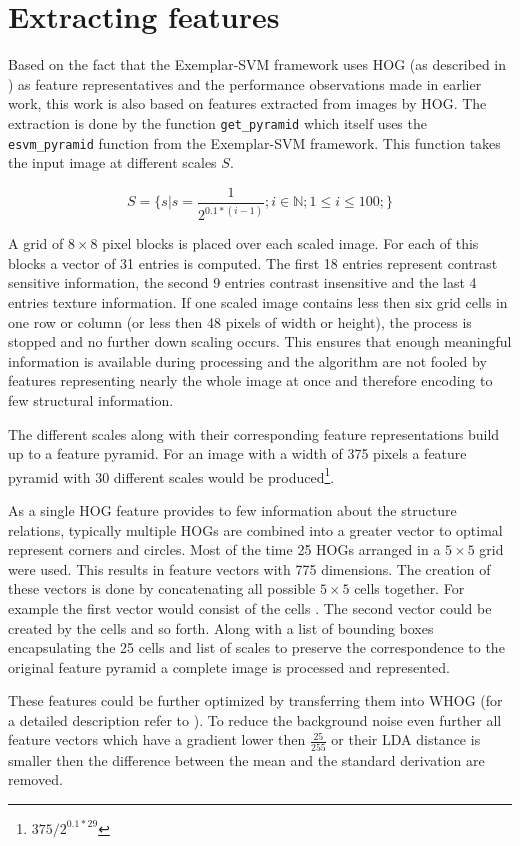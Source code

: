 \section{Extracting features}

Based on the fact that the Exemplar-SVM framework \cite{Malisiewicz2011} uses \ac{HOG} (as described in ) as feature representatives and the performance observations made in earlier work, this work is also based on features extracted from images by \ac{HOG}. The extraction is done by the function \verb|get_pyramid| which itself uses the \verb|esvm_pyramid| function from the Exemplar-SVM framework. This function takes the input image at different scales $S$.

\begin{equation}
S = \{s|s = \frac{1}{2^{0.1 * (i-1)}}; i \in \mathbb{N}; 1 \le i \le 100;\}
\end{equation}

A grid of $8\times8$ pixel blocks is placed over each scaled image. For each of this blocks a vector of 31 entries is computed. The first 18 entries represent contrast sensitive information, the second 9 entries contrast insensitive and the last 4 entries texture information. If one scaled image contains less then six grid cells in one row or column (or less then 48 pixels of width or height), the process is stopped and no further down scaling occurs. This ensures that enough meaningful information is available during processing and the algorithm are not fooled by features representing nearly the whole image at once and therefore encoding to few structural information.
\par
The different scales along with their corresponding feature representations build up to a feature pyramid. For an image with a width of 375 pixels a feature pyramid with 30 different scales would be produced\footnote{$375/2^{0.1 * 29}$}. 

As a single \ac{HOG} feature provides to few information about the structure relations, typically multiple \acp{HOG} are combined into a greater vector to optimal represent corners and circles. Most of the time 25 \acp{HOG} arranged in a $5\times5$ grid were used. This results in feature vectors with 775 dimensions. The creation of these vectors is done by concatenating all possible $5\times5$ cells together. For example the first vector would consist of the cells . The second vector could be created by the cells  and so forth. Along with a list of bounding boxes encapsulating the 25 cells and list of scales to preserve the correspondence to the original feature pyramid a complete image is processed and represented.
\par
These features could be further optimized by transferring them into \ac{WHOG} (for a detailed description refer to ). To reduce the background noise even further all feature vectors which have a gradient lower then $\frac{25}{255}$ or their \ac{LDA} distance is smaller then the difference between the mean and the standard derivation are removed.

